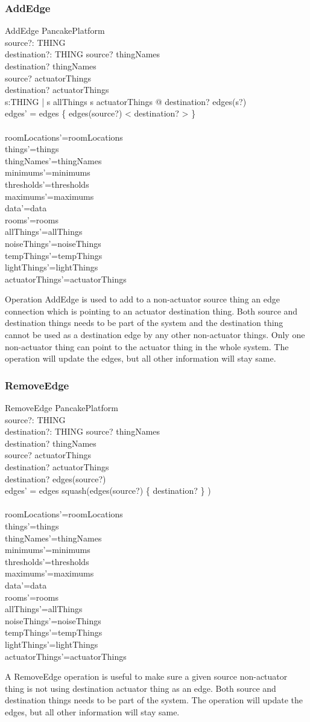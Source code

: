 \documentclass{article}
\newcommand{\same}[1]{\\{#1}'={#1}}
\newcommand{\sameObvious}[1]{\same{rooms}\same{allThings}\same{noiseThings}\same{tempThings}\same{lightThings}\same{actuatorThings}  }
\begin{document}
\newpage
\label{toc:AddEdge}
\subsubsection{AddEdge}
\begin{schema}{AddEdge}
  \Delta PancakePlatform \\
  source?: THING \\
  destination?: THING
\where
  source? \in \dom thingNames \\
  destination? \in \dom thingNames \\
  source? \notin actuatorThings \\
  destination? \in actuatorThings \\
  \forall s:THING | s \in allThings \land s \notin actuatorThings @  destination? \notin edges(s?) \\
  edges' = edges \oplus \{ edges(source?) \cat < destination? > \}  \\

  \same{roomLocations}
  \same{things}
  \same{thingNames}
  \same{minimums}
  \same{thresholds}
  \same{maximums}
  \same{data}
  \sameObvious{}

\end{schema}
Operation AddEdge is used to add to a non-actuator source thing an edge connection which is pointing to an actuator destination thing.  Both source and destination things needs to be part of the system and the destination thing cannot be used as a destination edge by any other non-actuator things. Only one non-actuator thing can point to the actuator thing in the whole system. The operation will update the edges, but all other information will stay same.

\newpage
\label{toc:RemoveEdge}
\subsubsection{RemoveEdge}
\begin{schema}{RemoveEdge}
  \Delta PancakePlatform \\
  source?: THING \\
  destination?: THING
\where
  source? \in \dom thingNames \\
  destination? \in \dom thingNames \\
  source? \notin actuatorThings \\
  destination? \in actuatorThings \\
  destination? \notin edges(source?) \\
  edges' = edges \oplus squash(edges(source?) \nrres \{ destination? \}  ) \\


  \same{roomLocations}
  \same{things}
  \same{thingNames}
  \same{minimums}
  \same{thresholds}
  \same{maximums}
  \same{data}
  \sameObvious{}
\end{schema}
A RemoveEdge operation is useful to make sure a given source non-actuator thing is not using destination actuator thing as an edge. Both source and destination things needs to be part of the system. The operation will update the edges, but all other information will stay same.
\end{document}
